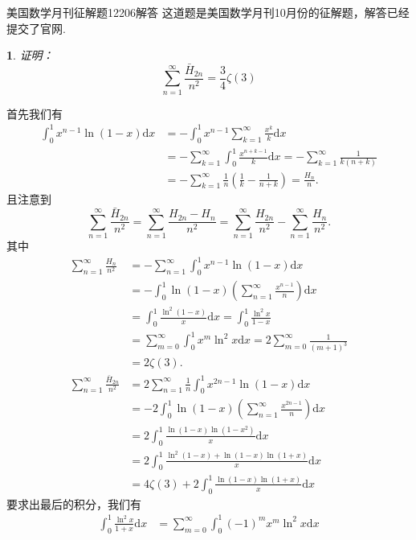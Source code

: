\documentclass[UTF8,no-math,12pt,openany,table,dvipsnames,svgnames]{book}
\newcommand{\hei}{\CJKfamily{hei}}
\newenvironment{Proof}{\par\indent{\hei 证明}\hspace{1em}}{\par}
\newtheorem{example}{}
\begin{document}
\begin{MYBOX}[colbacktitle=blue]{美国数学月刊征解题12206解答}
这道题是美国数学月刊10月份的征解题，解答已经提交了官网.
\begin{example}
  证明：
  \[
    \sum_{n=1}^\infty \frac{\bar H_{2n}}{n^2} = \frac34\zeta(3)
  \]
\end{example}
\tcblower
\begin{Proof}
  首先我们有
  \begin{align*}
    \int_0^1x^{n-1}\ln(1-x)\mathrm dx & = -\int_0^1 x^{n-1}\sum_{k=1}^\infty \frac{x^k}k  \mathrm dx \\
    & = -\sum_{k=1}^\infty \int_0^1\frac{x^{n+k-1}} k \mathrm dx  = -\sum_{k=1}^\infty \frac 1{k(n+k)} \\
    & = -\sum_{k=1}^\infty \frac1n\left( \frac1k-\frac1{n+k} \right)= \frac{H_n}n.
  \end{align*}
  且注意到
  \[
    \sum_{n=1}^\infty \frac{\bar H_{2n}}{n^2}  =
    \sum_{n=1}^\infty \frac{H_{2n}-H_n}{n^2} =
    \sum_{n=1}^\infty \frac{H_{2n}}{n^2} - \sum_{n=1}^\infty \frac{H_n}{n^2}.
  \]
  其中
  \begin{align*}
    \sum_{n=1}^\infty \frac{H_n}{n^2} & =
    -\sum_{n=1}^\infty \int_0^1x^{n-1}\ln(1-x)\mathrm dx\\
    & = -\int_0^1\ln(1-x)\left( \sum_{n=1}^\infty\frac{x^{n-1}}n \right)\mathrm dx\\
    & = \int_0^1\frac{\ln^2(1-x)}x\mathrm dx = \int_0^1\frac{\ln^2 x}{1-x} \\
    & = \sum_{m=0}^\infty \int_0^1x^m\ln^2x\mathrm dx
      = 2\sum_{m=0}^\infty \frac1{(m+1)^3}\\
    & = 2\zeta(3).\\
    \sum_{n=1}^\infty \frac{\bar H_{2n}}{n^2}
    & = 2\sum_{n=1}^\infty \frac1n\int_0^1x^{2n-1}\ln(1-x) \mathrm dx\\
    & = -2\int_0^1\ln(1-x)\left( \sum_{n=1}^\infty\frac{x^{2n-1}}n \right)\mathrm dx\\
    & = 2\int_0^1\frac{\ln(1-x)\ln(1-x^2)}x \mathrm dx\\
    & = 2\int_0^1\frac{\ln^2(1-x)+\ln(1-x)\ln(1+x)}x \mathrm dx\\
    & = 4\zeta(3) + 2\int_0^1\frac{\ln(1-x)\ln(1+x)}x \mathrm dx
    \end{align*}
    要求出最后的积分，我们有
    \begin{align*}
      \int_0^1 \frac{\ln^2x}{1+x}\mathrm dx
      & = \sum_{m=0}^\infty\int_0^1(-1)^mx^m\ln^2x\mathrm dx \\

\end{align*}
\end{Proof}
\end{MYBOX}
\end{document}
